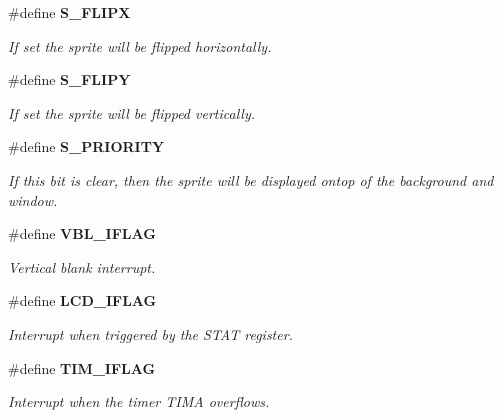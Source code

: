 \begin{CompactItemize}
\item 
\label{gb.h_a14}
\#define {\bf S\_\-FLIPX}
\begin{CompactList}\small\item\em If set the sprite will be flipped horizontally.\item\end{CompactList}

\item 
\label{gb.h_a15}
\#define {\bf S\_\-FLIPY}
\begin{CompactList}\small\item\em If set the sprite will be flipped vertically.\item\end{CompactList}

\item 
\label{gb.h_a16}
\#define {\bf S\_\-PRIORITY}
\begin{CompactList}\small\item\em If this bit is clear, then the sprite will be displayed ontop of the background and window.\item\end{CompactList}

\item 
\#define {\bf VBL\_\-IFLAG}
\begin{CompactList}\small\item\em Vertical blank interrupt.\item\end{CompactList}

\item 
\#define {\bf LCD\_\-IFLAG}
\begin{CompactList}\small\item\em Interrupt when triggered by the STAT register.\item\end{CompactList}

\item 
\label{gb.h_a19}
\#define {\bf TIM\_\-IFLAG}
\begin{CompactList}\small\item\em Interrupt when the timer TIMA overflows.\item\end{CompactList}


\end{CompactItemize}
